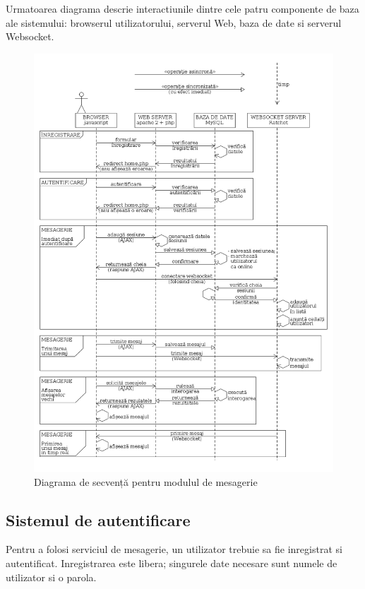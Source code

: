 \documentclass[12pt,a4paper]{article}
\begin{document}
Urmatoarea diagrama descrie interactiunile dintre cele patru componente 
de baza ale sistemului: browserul utilizatorului, serverul Web, baza de date si
serverul Websocket.

%
\newpage
\begin{figure}[!ht]
\centering
\includegraphics[height=0.97\textheight]{diagrame/chat_sequence.png}
\vspace{-20pt} 
\caption{Diagrama de secvență pentru modulul de mesagerie \label{overflow}}
\vspace{-20pt} 
\end{figure}

\subsection{Sistemul de autentificare}
Pentru a folosi serviciul de mesagerie, un utilizator trebuie sa fie inregistrat si autentificat. Inregistrarea este libera; singurele date necesare sunt numele de utilizator
si o parola.
\end{document}
